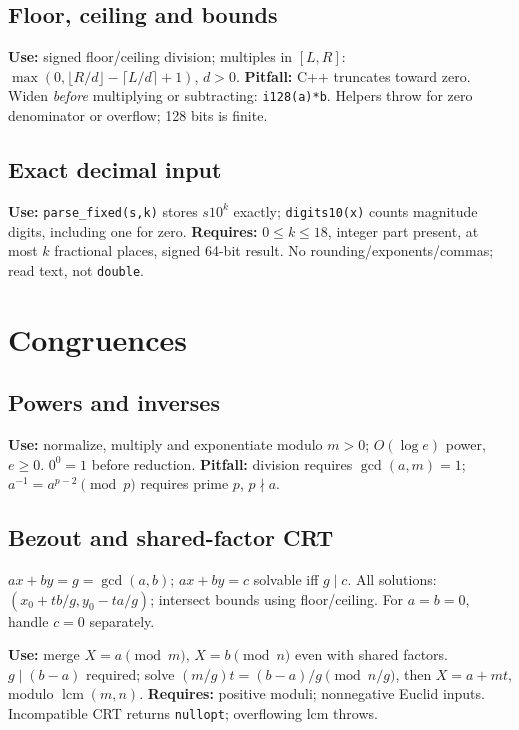\subsection{Floor, ceiling and bounds}
\textbf{Use:} signed floor/ceiling division; multiples in $[L,R]$:
$\max(0,\lfloor R/d\rfloor-\lceil L/d\rceil+1)$, $d>0$.
\textbf{Pitfall:} C++ truncates toward zero. Widen \emph{before} multiplying
or subtracting: \texttt{i128(a)*b}. Helpers throw for zero denominator or
overflow; 128 bits is finite.

\subsection{Exact decimal input}
\textbf{Use:} \texttt{parse\_fixed(s,k)} stores $s10^k$ exactly;
\texttt{digits10(x)} counts magnitude digits, including one for zero.
\textbf{Requires:} $0\le k\le18$, integer part present, at most $k$
fractional places, signed 64-bit result. No rounding/exponents/commas;
read text, not \texttt{double}.

\section{Congruences}
\subsection{Powers and inverses}
\textbf{Use:} normalize, multiply and exponentiate modulo $m>0$;
$O(\log e)$ power, $e\ge0$. $0^0=1$ before reduction.
\textbf{Pitfall:} division requires $\gcd(a,m)=1$;
$a^{-1}=a^{p-2}\pmod p$ requires prime $p$, $p\nmid a$.

\subsection{Bezout and shared-factor CRT}
$ax+by=g=\gcd(a,b)$; $ax+by=c$ solvable iff $g\mid c$.
All solutions: $(x_0+tb/g,y_0-ta/g)$; intersect bounds using floor/ceiling.
For $a=b=0$, handle $c=0$ separately.

\textbf{Use:} merge $X=a\pmod m$, $X=b\pmod n$ even with shared factors.
$g\mid(b-a)$ required; solve $(m/g)t=(b-a)/g\pmod{n/g}$,
then $X=a+mt$, modulo $\operatorname{lcm}(m,n)$.
\textbf{Requires:} positive moduli; nonnegative Euclid inputs.
Incompatible CRT returns \texttt{nullopt}; overflowing lcm throws.

